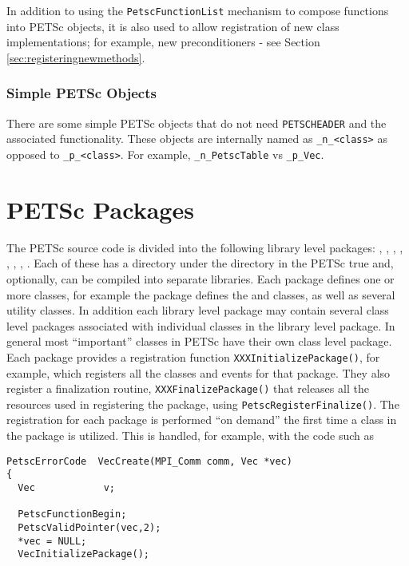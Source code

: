 In addition to using the \lstinline{PetscFunctionList} mechanism to compose functions into PETSc objects, it is also used to allow registration of new class implementations; for example, new preconditioners - see Section \ref{sec:registeringnewmethods}.

\subsection{Simple PETSc Objects}

There are some simple PETSc objects that do not need \lstinline{PETSCHEADER} and
the associated functionality. These objects are internally named as
\lstinline{_n_<class>} as opposed to \lstinline{_p_<class>}. For example, \lstinline{_n_PetscTable}
vs \lstinline{_p_Vec}.

\chapter{PETSc Packages}

The PETSc source code is divided into the following
library level packages: , , , , , , , . Each
of these has a directory under the  directory in the PETSc
true and, optionally, can be compiled into separate libraries. Each
package defines one or more classes, for example the  package
defines the  and  classes, as well as several utility
classes. In addition each library level package may contain several class level packages associated with individual classes in the library level package. In general most ``important'' classes in PETSc have their own class level package.
Each package provides a registration
function \lstinline{XXXInitializePackage()}, for
example,  which registers all the classes
and events for that package. They also register a finalization
routine, \lstinline{XXXFinalizePackage()} that releases all the
resources used in registering the package,
using \lstinline{PetscRegisterFinalize()}. The registration for each package is performed ``on demand'' the first time a class in the package is utilized. This is handled, for example, with the code such as
\begin{lstlisting}
PetscErrorCode  VecCreate(MPI_Comm comm, Vec *vec)
{
  Vec            v;

  PetscFunctionBegin;
  PetscValidPointer(vec,2);
  *vec = NULL;
  VecInitializePackage();
\end{lstlisting}


